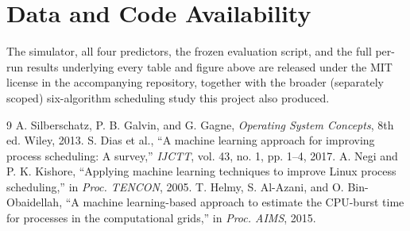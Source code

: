 \documentclass[10pt,twocolumn]{article}
\begin{document}
\section*{Data and Code Availability}
The simulator, all four predictors, the frozen evaluation script, and the full per-run results underlying every table and figure above are released under the MIT license in the accompanying repository, together with the broader (separately scoped) six-algorithm scheduling study this project also produced.



\balance
\begin{thebibliography}{9}
\footnotesize
{} A. Silberschatz, P. B. Galvin, and G. Gagne, \textit{Operating System Concepts}, 8th ed. Wiley, 2013.
 S. Dias et al., ``A machine learning approach for improving process scheduling: A survey,'' \textit{IJCTT}, vol. 43, no. 1, pp. 1--4, 2017.
 A. Negi and P. K. Kishore, ``Applying machine learning techniques to improve Linux process scheduling,'' in \textit{Proc. TENCON}, 2005.
 T. Helmy, S. Al-Azani, and O. Bin-Obaidellah, ``A machine learning-based approach to estimate the CPU-burst time for processes in the computational grids,'' in \textit{Proc. AIMS}, 2015.
\end{thebibliography}
\end{document}
